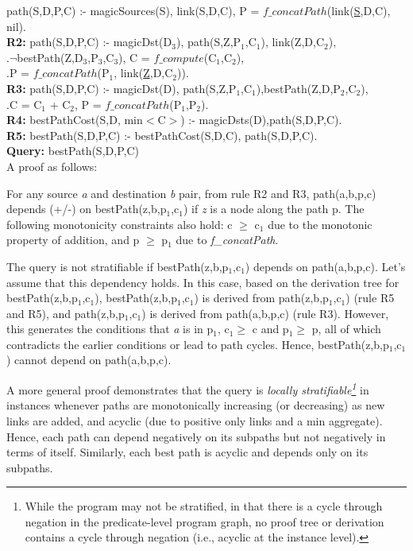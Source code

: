 \documentclass{article}
\newcommand{\datalogspace}{\textcolor[gray]{1}{.}\hspace{0.8in}}
\begin{document}
 path(S,D,P,C) :- magicSources(S),
link(S,D,C), P = $f\_concatPath$(link(\underline{S},D,C), nil). \\
{\bf R2:} path(S,D,P,C) :- magicDst(D$_{3}$), path(S,Z,P$_{1}$,C$_{1}$), link(Z,D,C$_{2}$),\\
\datalogspace $\neg$bestPath(Z,D$_{3}$,P$_{3}$,C$_{3}$), C =
$f\_compute$(C$_{1}$,C$_{2}$), \\
\datalogspace P = $f\_concatPath$(P$_{1}$, link(\underline{Z},D,C$_{2}$)).\\ 
{\bf R3:} path(S,D,P,C) :- magicDst(D),
path(S,Z,P$_{1}$,C$_{1}$),bestPath(Z,D,P$_{2}$,C$_{2}$), \\
\datalogspace C = C$_{1}$ + C$_{2}$, P = $f\_concatPath$(P$_{1}$,P$_{2}$). \\
{\bf R4: } bestPathCost(S,D, min$<$C$>$) :- magicDsts(D),path(S,D,P,C). \\
{\bf R5: } bestPath(S,D,P,C) :-
bestPathCost(S,D,C), path(S,D,P,C). \\
{\bf Query: } bestPath(S,D,P,C)\\


A proof as follows:

For any source {\em a} and destination {\em b} pair, from rule R2 and R3, path(a,b,p,c)
depends (+/-) on bestPath(z,b,p$_{1}$,c$_{1}$) if {\em z} is a node along the
path p. The following monotonicity constraints also hold: c $\ge$ c$_{1}$ due to the
monotonic property of addition, and p $\ge$ p$_{1}$ due to {\em
  f\_concatPath}. 

The query is not stratifiable if bestPath(z,b,p$_{1}$,c$_{1}$) depends on
path(a,b,p,c). Let's assume that this dependency holds. In this case,
based on the derivation tree for bestPath(z,b,p$_{1}$,c$_{1}$),
bestPath(z,b,p$_{1}$,c$_{1}$) is derived from path(z,b,p$_{1}$,c$_{1}$)
(rule R5 and R5),
and path(z,b,p$_{1}$,c$_{1}$) is derived from path(a,b,p,c) (rule R3). However, 
this generates the conditions that {\em a} is in p$_{1}$, c$_{1} \ge $ c
and p$_{1} \ge$ p, all of which contradicts the earlier conditions or
lead to path cycles. Hence,
bestPath(z,b,p$_{1}$,c$_{1}$) cannot depend on path(a,b,p,c). 

A more general proof demonstrates that the query is {\em locally
stratifiable\footnote{While the program may not be
stratified, in that there is a cycle through negation in the
predicate-level program graph, no proof tree or derivation contains a
cycle through negation (i.e., acyclic at the instance level).}} in instances whenever paths are monotonically increasing
(or decreasing) as new links are added, and acyclic (due to positive
only links and a min aggregate). Hence, each path
can depend negatively on its subpaths but not negatively
in terms of itself. Similarly, each best path is acyclic and depends only on its subpaths.
\end{document}
